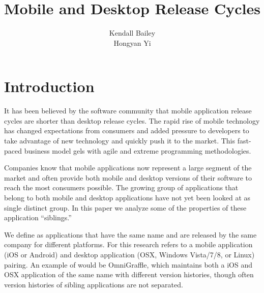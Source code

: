 \documentclass{acm_proc_article-sp}
\begin{document}
\title{Mobile and Desktop Release Cycles}

\author{
\alignauthor
Kendall Bailey \\
\alignauthor
Hongyan Yi \\
}

\maketitle



\section{Introduction}

It has been believed by the software community that mobile application release cycles are shorter than desktop release cycles. 
The rapid rise of mobile technology has changed expectations from consumers and added pressure to developers to take advantage of new technology and quickly push it to the market.
This fast-paced business model gels with agile and extreme programming methodologies.

Companies know that mobile applications now represent a large segment of the market and often provide both mobile and desktop versions of their software to reach the most consumers possible.
The growing group of applications that belong to both mobile and desktop applications have not yet been looked at as single distinct group.
In this paper we analyze some of the properties of these application ``siblings.''

We define \textbf{\sibs} as applications that have the same name and are released by the same company for different platforms. 
For this research \sibs refers to a mobile application (iOS or Android) and desktop application (OSX, Windows Vista/7/8, or Linux) pairing.
An example of \sibs would be OmniGraffle, which maintains both a iOS and OSX application of the same name with different version histories, though often version histories of sibling applications are not separated.
\end{document}

